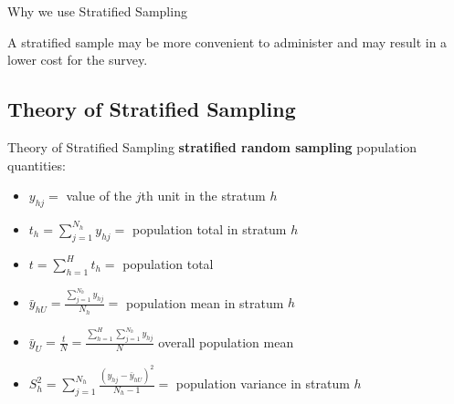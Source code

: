 \documentclass[10pt]{beamer}\usepackage[]{graphicx}\usepackage[]{xcolor}
\begin{document}
\begin{frame}{Why we use Stratified  Sampling}
{\begin{block}{A stratified sample may be more convenient to administer and may result in a lower cost for the survey.}
\begin{itemize}
\end{itemize}
\end{block}
}
\end{frame}

\subsection{Theory of Stratified Sampling}
\begin{frame}{Theory of Stratified Sampling}
\textbf{stratified random sampling} population quantities:

\begin{itemize}
\item $y_{hj}=$ value of the $j$th unit in the stratum $h$
\item $t_h=\sum_{j=1}^{N_h} y_{hj}=$ population total in stratum $h$
\item $t=\sum_{h=1}^H t_h =$ population total
\item $\bar{y}_{hU} = \frac{\sum_{j=1}^{N_h} y_{hj}}{N_h} =$ population mean in stratum $h$
\item $\bar{y}_U = \frac{t}{N} = \frac{\sum_{h=1}^H \sum_{j=1}^{N_h} y_{hj}}{N}$ overall population mean
\item $S_h^2 = \sum_{j=1}^{N_h} \frac{(y_{hj}-\bar{y}_{hU})^2}{N_h-1}=$ population variance in stratum $h$
\end{itemize}
\end{frame}
\end{document}
